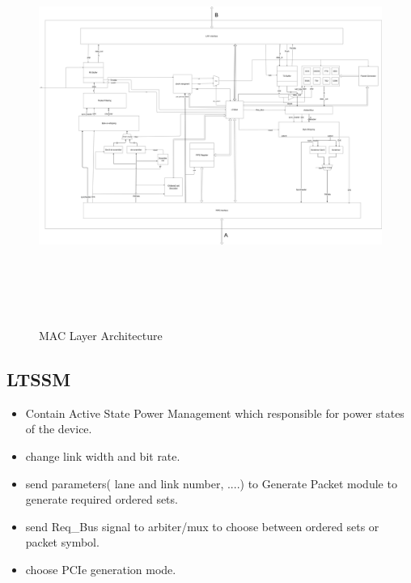  \begin{figure}[H]
  \centering
  \includegraphics[width=130mm,height=130mm]{images/design-abstract (2).png}
  \caption{MAC Layer Architecture}
  
  \label{fig:arch}
\end{figure}

\subsection{LTSSM}
 \begin{itemize}
     \item Contain Active State Power Management which responsible for power states of the device.
     \item change link width and bit rate. 
     \item send parameters( lane and link number, ....) to Generate Packet module to generate required ordered sets. 
     \item send Req\_Bus signal to arbiter/mux to choose between ordered sets or packet symbol.
     \item choose PCIe generation mode.
 \end{itemize}
 
